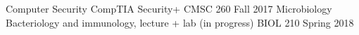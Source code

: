 \begin{cvdiwrapper}

  \cvdateitem
    {Computer Security} %
    {CompTIA Security+} %
    {CMSC 260} %
    {Fall 2017} %
   \cvdateitem
    {Microbiology} %
    {Bacteriology and immunology, lecture + lab (in progress)} %
    {BIOL 210} %
    {Spring 2018} %

\end{cvdiwrapper}

